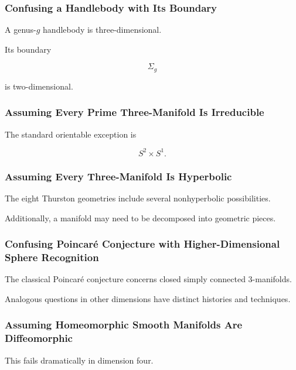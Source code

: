 \subsubsection{Confusing a Handlebody with Its Boundary}

A genus-\(g\) handlebody is three-dimensional.

Its boundary

\[
\Sigma_g
\]

is two-dimensional.

\subsubsection{Assuming Every Prime Three-Manifold Is Irreducible}

The standard orientable exception is

\[
\boxed{
S^2\times S^1.
}
\]

\subsubsection{Assuming Every Three-Manifold Is Hyperbolic}

The eight Thurston geometries include several nonhyperbolic possibilities.

Additionally, a manifold may need to be decomposed into geometric pieces.

\subsubsection{Confusing Poincar\'e Conjecture with Higher-Dimensional Sphere Recognition}

The classical Poincar\'e conjecture concerns closed simply connected
\(3\)-manifolds.

Analogous questions in other dimensions have distinct histories and
techniques.

\subsubsection{Assuming Homeomorphic Smooth Manifolds Are Diffeomorphic}

This fails dramatically in dimension four.

